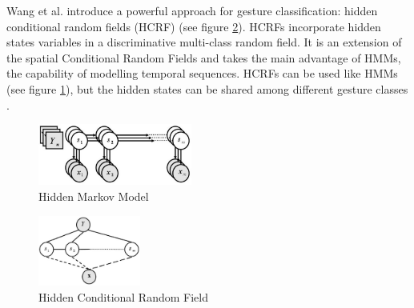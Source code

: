 Wang et al. introduce a powerful approach for gesture classification: hidden conditional random fields (HCRF) (see figure \ref{fig:hcrf}). HCRFs incorporate hidden states variables in a discriminative multi-class random field. It is an extension of the spatial Conditional Random Fields and takes the main advantage of HMMs, the capability of modelling temporal sequences. HCRFs can be used like HMMs (see figure \ref{fig:hmm}), but the hidden states can be shared among different gesture classes \cite{Wang}. 
\begin{figure}[h!]
\center
\includegraphics[width=0.45\textwidth]{images/seminar/hmm.png}
\caption{Hidden Markov Model \cite{Wang}}
\label{fig:hmm}
\end{figure}
\begin{figure}[h!]
\center
\includegraphics[width=0.3\textwidth]{images/seminar/hcrf.png}
\caption{Hidden Conditional Random Field \cite{Wang}}
\label{fig:hcrf}
\end{figure}





